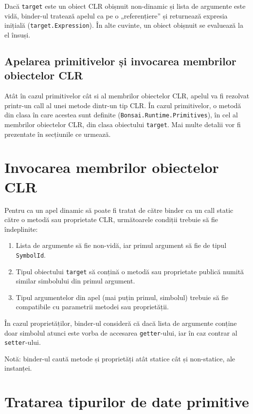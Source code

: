 \documentclass[12pt,a4paper]{memoir}
\renewcommand{\c}{\texttt}
\begin{document}
Dacă \c{target} este un obiect CLR obișnuit non-dinamic și lista de argumente este vidă, binder-ul tratează apelul ca pe o „referențiere” și returnează expresia inițială (\c{target.Expression}). În alte cuvinte, un obiect obișnuit se evaluează la el însuși.

\subsection{Apelarea primitivelor și invocarea membrilor obiectelor CLR}

Atât în cazul primitivelor cât si al membrilor obiectelor CLR, apelul va fi rezolvat printr-un call al unei metode dintr-un tip CLR. În cazul primitivelor, o metodă din clasa în care acestea sunt definite (\c{Bonsai.Runtime.Primitives}), în cel al membrilor obiectelor CLR, din clasa obiectului \c{target}. Mai multe detalii vor fi prezentate în secțiunile ce urmează.

\section{Invocarea membrilor obiectelor CLR}\label{sec:invoking_clr_members}

Pentru ca un apel dinamic să poate fi tratat de către binder ca un call static către o metodă sau proprietate CLR, următoarele condiții trebuie să fie îndeplinite:

\begin{enumerate}
\item Lista de argumente să fie non-vidă, iar primul argument să fie de tipul \c{SymbolId}.
\item Tipul obiectului \c{target} să conțină o metodă sau proprietate publică numită similar simbolului din primul argument.
\item Tipul argumentelor din apel (mai puțin primul, simbolul) trebuie să fie compatibile cu parametrii metodei sau proprietății.
\end{enumerate}

În cazul proprietăților, binder-ul consideră că dacă lista de argumente conține doar simbolul atunci este vorba de accesarea \c{getter}-ului, iar în caz contrar al \c{setter}-ului. 

Notă: binder-ul caută metode și proprietăți atât statice cât și non-statice, ale instanței. 

\section{Tratarea tipurilor de date primitive}\label{ch:runtime_sec:primitives}
\end{document}
